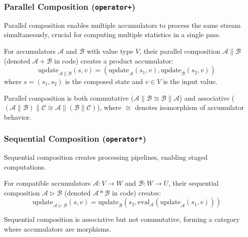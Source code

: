 \documentclass[sigconf]{acmart}
\begin{document}
\subsubsection{Parallel Composition (\texttt{operator+})}

Parallel composition enables multiple accumulators to process the same stream simultaneously, crucial for computing multiple statistics in a single pass.

\begin{definition}
For accumulators $\mathcal{A}$ and $\mathcal{B}$ with value type $V$, their parallel composition $\mathcal{A} \parallel \mathcal{B}$ (denoted $\mathcal{A} + \mathcal{B}$ in code) creates a product accumulator:
$$\text{update}_{\mathcal{A} \parallel \mathcal{B}}(s, v) = (\text{update}_{\mathcal{A}}(s_1, v), \text{update}_{\mathcal{B}}(s_2, v))$$
where $s = (s_1, s_2)$ is the composed state and $v \in V$ is the input value.
\end{definition}

\begin{theorem}
Parallel composition is both commutative ($\mathcal{A} \parallel \mathcal{B} \cong \mathcal{B} \parallel \mathcal{A}$) and associative ($(\mathcal{A} \parallel \mathcal{B}) \parallel \mathcal{C} \cong \mathcal{A} \parallel (\mathcal{B} \parallel \mathcal{C})$), where $\cong$ denotes isomorphism of accumulator behavior.
\end{theorem}

\subsubsection{Sequential Composition (\texttt{operator*})}

Sequential composition creates processing pipelines, enabling staged computations.

\begin{definition}
For compatible accumulators $\mathcal{A}: V \rightarrow W$ and $\mathcal{B}: W \rightarrow U$, their sequential composition $\mathcal{A} \triangleright \mathcal{B}$ (denoted $\mathcal{A} * \mathcal{B}$ in code) creates:
$$\text{update}_{\mathcal{A} \triangleright \mathcal{B}}(s, v) = \text{update}_{\mathcal{B}}(s_2, \text{eval}_{\mathcal{A}}(\text{update}_{\mathcal{A}}(s_1, v)))$$
\end{definition}

\begin{theorem}
Sequential composition is associative but not commutative, forming a category where accumulators are morphisms.
\end{theorem}
\end{document}
